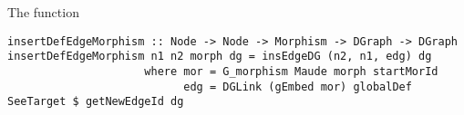 The function

{\codesize
\begin{verbatim}
insertDefEdgeMorphism :: Node -> Node -> Morphism -> DGraph -> DGraph
insertDefEdgeMorphism n1 n2 morph dg = insEdgeDG (n2, n1, edg) dg
                     where mor = G_morphism Maude morph startMorId
                           edg = DGLink (gEmbed mor) globalDef SeeTarget $ getNewEdgeId dg
\end{verbatim}
}




















